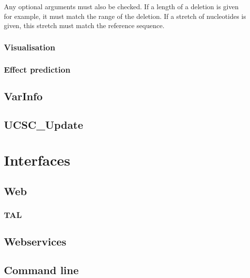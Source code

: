 \documentclass{article}
\begin{document}
Any optional arguments must also be checked. If a length of a deletion is given
for example, it must match the range of the deletion. If a stretch of
nucleotides is given, this stretch must match the reference sequence.

\subsubsection{Visualisation}

\subsubsection{Effect prediction}

\subsection{VarInfo} \label{subsec:varinfo}

\subsection{UCSC\_Update} \label{subsec:ucsc_update}

\newpage

\section{Interfaces} \label{sec:interfaces}

\subsection{Web} \label{subsec:webinterface}

\subsubsection{TAL} \label{subsubsec:templates}

\subsection{Webservices} \label{subsec:webservinterface}

\subsection{Command line} \label{subsec:commandline}

\newpage
\end{document}
